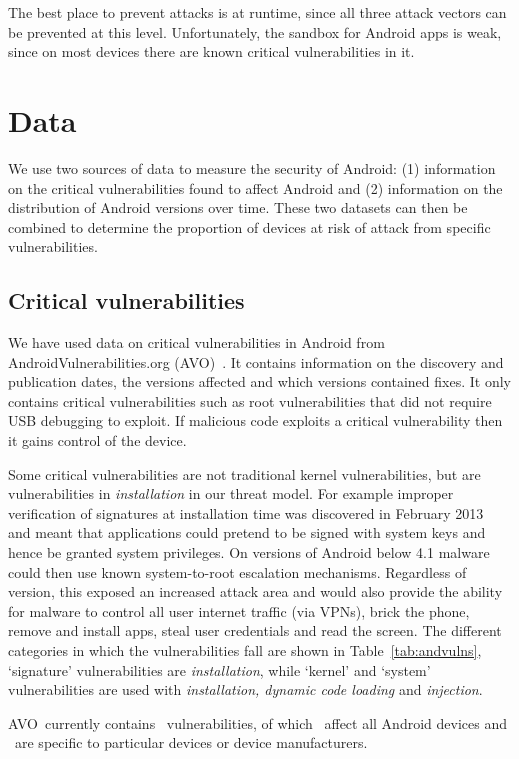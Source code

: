 \documentclass{sig-alternate-2013}
\newcommand{\avo}{AVO}
\begin{document}
The best place to prevent attacks is at runtime, since all three attack vectors can be prevented at this level. 
Unfortunately, the sandbox for Android apps is weak, since on most devices there are known critical vulnerabilities in it.

\section{Data}
We use two sources of data to measure the security of Android: (1) information on the critical vulnerabilities found to affect Android and (2) information on the distribution of Android versions over time.
These two datasets can then be combined to determine the proportion of devices at risk of attack from specific vulnerabilities.

\subsection{Critical vulnerabilities}\label{sec:avo}
We have used data on critical vulnerabilities in Android from AndroidVulnerabilities.org (\avo)~\cite{androidvulnerabilities.org}.
It contains information on the discovery and publication dates, the versions affected and which versions contained fixes.
It only contains critical vulnerabilities such as root vulnerabilities that did not require USB debugging to exploit.
If malicious code exploits a critical vulnerability then it gains control of the device.

Some critical vulnerabilities are not traditional kernel vulnerabilities, but are vulnerabilities in \emph{installation} in our threat model.
For example improper verification of signatures at installation time was discovered in February 2013~\cite{Forristal2013} and meant that applications could pretend to be signed with system keys and hence be granted system privileges.
On versions of Android below 4.1 malware could then use known system-to-root escalation mechanisms.
Regardless of version, this exposed an increased attack area and would also provide the ability for malware to control all user internet traffic (via VPNs), brick the phone, remove and install apps, steal user credentials and read the screen.
The different categories in which the vulnerabilities fall are shown in Table~\ref{tab:andvulns}, `signature' vulnerabilities are \emph{installation}, while `kernel' and `system' vulnerabilities are used with \emph{installation, dynamic code loading} and \emph{injection}.
\avoTabAndVulns

\avo\ currently contains \avoNumVulnerabilities\ vulnerabilities, of which \avoNumVulnAllAndroid\ affect all Android devices and \avoNumVulnSpecific\ are specific to particular devices or device manufacturers.
\end{document}
